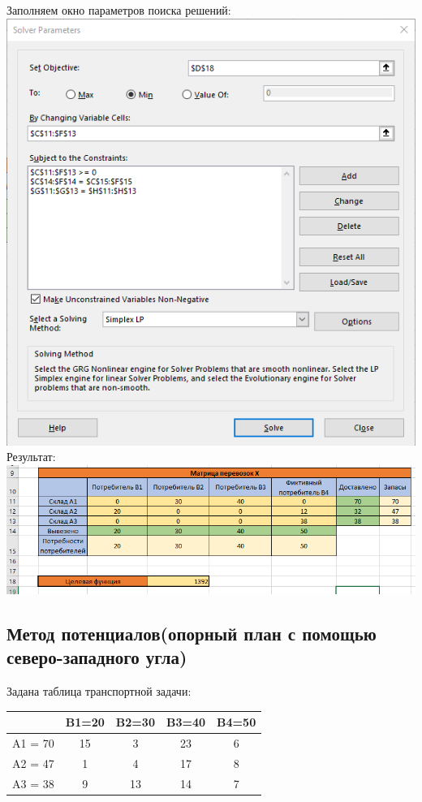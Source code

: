 \documentclass[a4paper, 12pt]{article}
\begin{document}
\newpage
Заполняем окно параметров поиска решений:\\

\includegraphics{2-4.png}\\

Результат: \\

\includegraphics[width=\textwidth]{2-5.png}\\
\subsection{Метод потенциалов(опорный план с помощью северо-западного угла)}

Задана таблица транспортной задачи:
\begin{table}[H]
\centering
\begin{tabular}{c|c|c|c|c|}
\cline{2-5}
                              & B1=20 & B2=30 & B3=40 & B4=50 \\ \hline
\multicolumn{1}{|c|}{A1 = 70} & 15    & 3     & 23    & 6     \\ \hline
\multicolumn{1}{|c|}{A2 = 47} & 1     & 4     & 17    & 8     \\ \hline
\multicolumn{1}{|c|}{A3 = 38} & 9     & 13    & 14    & 7     \\ \hline
\end{tabular}
\end{table}
\end{document}
